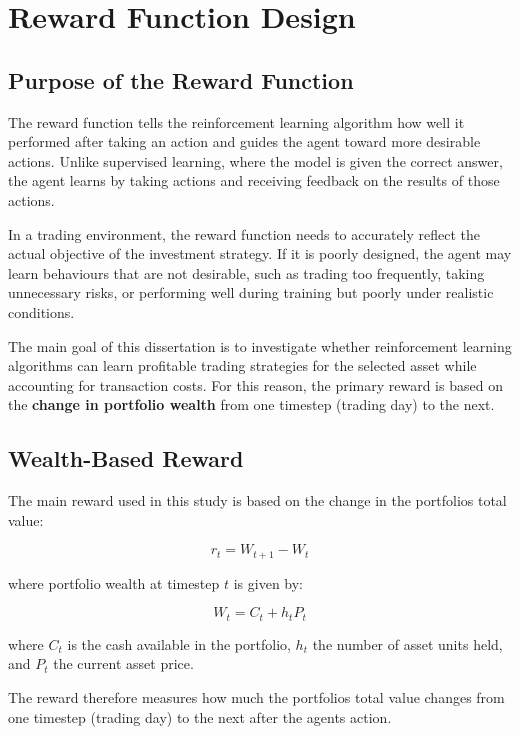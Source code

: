 \section{Reward Function Design}

\subsection{Purpose of the Reward Function}

The reward function tells the reinforcement learning algorithm how well
it performed after taking an action and guides the agent toward more
desirable actions. Unlike supervised learning, where the model is given
the correct answer, the agent learns by taking actions and receiving
feedback on the results of those actions.

In a trading environment, the reward function needs to accurately
reflect the actual objective of the investment strategy. If it is poorly
designed, the agent may learn behaviours that are not desirable, such as
trading too frequently, taking unnecessary risks, or performing well
during training but poorly under realistic conditions.

The main goal of this dissertation is to investigate whether
reinforcement learning algorithms can learn profitable trading
strategies for the selected asset while accounting for transaction
costs. For this reason, the primary reward is based on the
\textbf{change in portfolio wealth} from one timestep (trading day) to
the next.

\subsection{Wealth-Based Reward}

The main reward used in this study is based on the change in the
portfolio\textquotesingle s total value:

\[r_{t} = W_{t + 1} - W_{t}\]

where portfolio wealth at timestep \(t\) is given by:

\[W_{t} = C_{t} + h_{t}P_{t}\]

where \(C_{t}\) is the cash available in the portfolio, \(h_{t}\) the
number of asset units held, and \(P_{t}\) the current asset price.

The reward therefore measures how much the portfolio\textquotesingle s
total value changes from one timestep (trading day) to the next after
the agent\textquotesingle s action.

